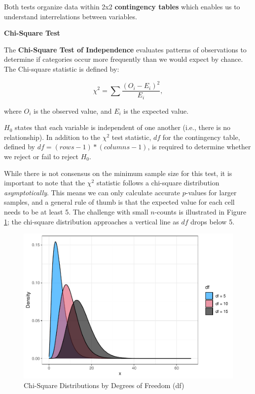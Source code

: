 \documentclass[]{book}
\begin{document}
Both tests organize data within 2x2 \textbf{contingency tables} which enables us to understand interrelations between variables.

\textbf{Chi-Square Test}

The \textbf{Chi-Square Test of Independence} evaluates patterns of observations to determine if categories occur more frequently than we would expect by chance. The Chi-square statistic is defined by:

\[ {\chi}^2 = \sum\frac{(O_i - E_i)^2}{E_i}, \]

where \(O_i\) is the observed value, and \(E_i\) is the expected value.

\(H_0\) states that each variable is independent of one another (i.e., there is no relationship). In addition to the \({\chi}^2\) test statistic, \(df\) for the contingency table, defined by \(df = (rows - 1) * (columns - 1)\), is required to determine whether we reject or fail to reject \(H_0\).

While there is not consensus on the minimum sample size for this test, it is important to note that the \({\chi}^2\) statistic follows a chi-square distribution \emph{asymptotically}. This means we can only calculate accurate \(p\)-values for larger samples, and a general rule of thumb is that the expected value for each cell needs to be at least 5. The challenge with small \(n\)-counts is illustrated in Figure \ref{fig:chisq-dist}; the chi-square distribution approaches a vertical line as \(df\) drops below 5.

\begin{figure}

{\centering \includegraphics[width=1\linewidth]{The_People_Analytics_Companion_files/figure-latex/chisq-dist-1} 

}

\caption{Chi-Square Distributions by Degrees of Freedom (df)}\label{fig:chisq-dist}
\end{figure}
\end{document}

